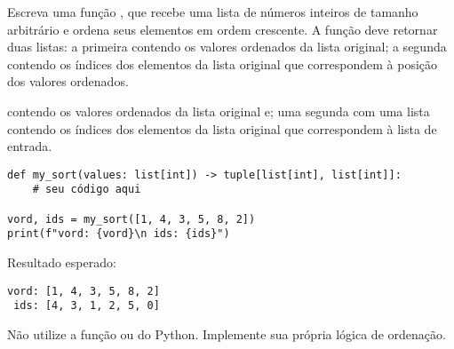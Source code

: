 Escreva uma função  , que recebe uma lista de números inteiros de tamanho arbitrário e ordena
seus elementos em ordem crescente.
A função deve retornar duas listas: a primeira contendo os valores ordenados da lista original; a segunda contendo os
índices dos elementos da lista original que correspondem à posição dos valores ordenados.

contendo os valores ordenados da lista original e; uma segunda com uma lista contendo os índices dos
elementos da lista original que correspondem à lista de entrada.

\begin{verbatim}
def my_sort(values: list[int]) -> tuple[list[int], list[int]]:
    # seu código aqui

vord, ids = my_sort([1, 4, 3, 5, 8, 2])
print(f"vord: {vord}\n ids: {ids}")
\end{verbatim}

Resultado esperado:
\begin{verbatim}
vord: [1, 4, 3, 5, 8, 2]
 ids: [4, 3, 1, 2, 5, 0]
\end{verbatim}

Não utilize a função  ou  do Python.
Implemente sua própria lógica de ordenação.


